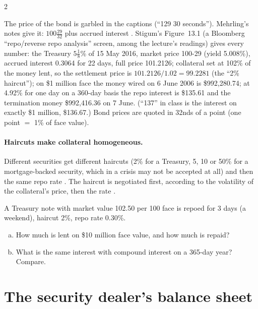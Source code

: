 \begin{paracol}{2}
\begin{coursenote}
The price of the bond is garbled in the captions (``129 30 seconds''). Mehrling's notes give it: $100\tfrac{29}{32}$ plus accrued interest . Stigum's
Figure~13.1 (a Bloomberg ``repo/reverse repo analysis'' screen, among the lecture's readings) gives every number: the Treasury $5\tfrac18$\% of 15 May 2016, market price
100-29 (yield 5.008\%), accrued interest 0.3064 for 22 days, full price 101.2126; collateral set at 102\% of the money lent, so the settlement price is
$101.2126/1.02 = 99.2281$ (the ``2\% haircut''); on \$1 million face the money wired on 6 June 2006 is \$992{,}280.74; at 4.92\% for one day on a 360-day basis the repo
interest is \$135.61 and the termination money \$992{,}416.36 on 7 June. (``137'' in class is the interest on exactly \$1 million, \$136.67.) Bond prices are quoted in 32nds
of a point (one point $=$ 1\% of face value).
\end{coursenote}

\paragraph{Haircuts make collateral homogeneous.} Different securities get different haircuts (2\% for a Treasury, 5, 10 or 50\% for a mortgage-backed
security, which in a crisis may not be accepted at all) and then the same repo rate . The haircut is negotiated first,
according to the volatility of the collateral's price, then the rate .

\begin{exercise}
A Treasury note with market value 102.50 per 100 face is repoed for 3 days (a weekend), haircut 2\%, repo rate 0.30\%.
\begin{enumerate}[(a)]
  \item How much is lent on \$10 million face value, and how much is repaid?
  \item What is the same interest with compound interest on a 365-day year? Compare.
\end{enumerate}
\end{exercise}

\section{The security dealer's balance sheet}\label{sec:rp-dealers}


\end{paracol}
